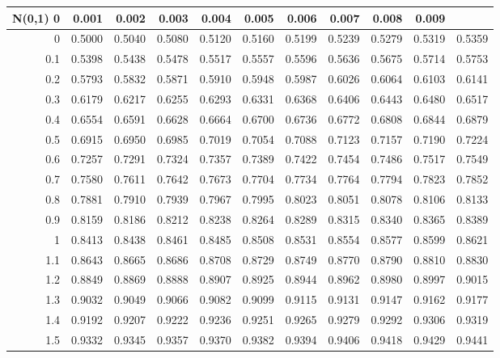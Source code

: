 \documentclass{article}
\begin{document}
	

\begin{center}
\begin{table}[ht]
\small
\centering
\begin{tabular}{rrrrrrrrrrr}
  \hline
\textbf{N(0,1)} 0 & 0.001 & 0.002 & 0.003 & 0.004 & 0.005 & 0.006 & 0.007 & 0.008 & 0.009 \\ 
  \hline
0 & 0.5000 & 0.5040 & 0.5080 & 0.5120 & 0.5160 & 0.5199 & 0.5239 & 0.5279 & 0.5319 & 0.5359 \\ 
  0.1 & 0.5398 & 0.5438 & 0.5478 & 0.5517 & 0.5557 & 0.5596 & 0.5636 & 0.5675 & 0.5714 & 0.5753 \\ 
  0.2 & 0.5793 & 0.5832 & 0.5871 & 0.5910 & 0.5948 & 0.5987 & 0.6026 & 0.6064 & 0.6103 & 0.6141 \\ 
  0.3 & 0.6179 & 0.6217 & 0.6255 & 0.6293 & 0.6331 & 0.6368 & 0.6406 & 0.6443 & 0.6480 & 0.6517 \\ 
  0.4 & 0.6554 & 0.6591 & 0.6628 & 0.6664 & 0.6700 & 0.6736 & 0.6772 & 0.6808 & 0.6844 & 0.6879 \\ 
  0.5 & 0.6915 & 0.6950 & 0.6985 & 0.7019 & 0.7054 & 0.7088 & 0.7123 & 0.7157 & 0.7190 & 0.7224 \\ 
  0.6 & 0.7257 & 0.7291 & 0.7324 & 0.7357 & 0.7389 & 0.7422 & 0.7454 & 0.7486 & 0.7517 & 0.7549 \\ 
  0.7 & 0.7580 & 0.7611 & 0.7642 & 0.7673 & 0.7704 & 0.7734 & 0.7764 & 0.7794 & 0.7823 & 0.7852 \\ 
  0.8 & 0.7881 & 0.7910 & 0.7939 & 0.7967 & 0.7995 & 0.8023 & 0.8051 & 0.8078 & 0.8106 & 0.8133 \\ 
  0.9 & 0.8159 & 0.8186 & 0.8212 & 0.8238 & 0.8264 & 0.8289 & 0.8315 & 0.8340 & 0.8365 & 0.8389 \\ 
  1 & 0.8413 & 0.8438 & 0.8461 & 0.8485 & 0.8508 & 0.8531 & 0.8554 & 0.8577 & 0.8599 & 0.8621 \\ 
  1.1 & 0.8643 & 0.8665 & 0.8686 & 0.8708 & 0.8729 & 0.8749 & 0.8770 & 0.8790 & 0.8810 & 0.8830 \\ 
  1.2 & 0.8849 & 0.8869 & 0.8888 & 0.8907 & 0.8925 & 0.8944 & 0.8962 & 0.8980 & 0.8997 & 0.9015 \\ 
  1.3 & 0.9032 & 0.9049 & 0.9066 & 0.9082 & 0.9099 & 0.9115 & 0.9131 & 0.9147 & 0.9162 & 0.9177 \\ 
  1.4 & 0.9192 & 0.9207 & 0.9222 & 0.9236 & 0.9251 & 0.9265 & 0.9279 & 0.9292 & 0.9306 & 0.9319 \\ 
  1.5 & 0.9332 & 0.9345 & 0.9357 & 0.9370 & 0.9382 & 0.9394 & 0.9406 & 0.9418 & 0.9429 & 0.9441 \\ 

\end{tabular}
\end{table}
\end{center}
\end{document}
